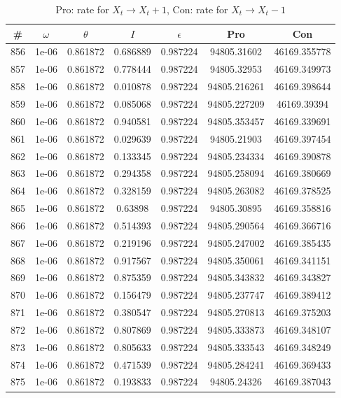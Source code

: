\newpage
\begin{table}
\caption{Pro: rate for $X_t \rightarrow X_t + 1$, Con: rate for $X_t \rightarrow X_t - 1$}
\begin{tabular*}{\linewidth}{c|c|c|c|c|c|c}
\# & $\omega$ & $\theta$ & $I$ & $\epsilon$ & Pro & Con \\
\hline
856 & 1e-06 & 0.861872 & 0.686889 & 0.987224 & 94805.31602 & 46169.355778\\
857 & 1e-06 & 0.861872 & 0.778444 & 0.987224 & 94805.32953 & 46169.349973\\
858 & 1e-06 & 0.861872 & 0.010878 & 0.987224 & 94805.216261 & 46169.398644\\
859 & 1e-06 & 0.861872 & 0.085068 & 0.987224 & 94805.227209 & 46169.39394\\
860 & 1e-06 & 0.861872 & 0.940581 & 0.987224 & 94805.353457 & 46169.339691\\
861 & 1e-06 & 0.861872 & 0.029639 & 0.987224 & 94805.21903 & 46169.397454\\
862 & 1e-06 & 0.861872 & 0.133345 & 0.987224 & 94805.234334 & 46169.390878\\
863 & 1e-06 & 0.861872 & 0.294358 & 0.987224 & 94805.258094 & 46169.380669\\
864 & 1e-06 & 0.861872 & 0.328159 & 0.987224 & 94805.263082 & 46169.378525\\
865 & 1e-06 & 0.861872 & 0.63898 & 0.987224 & 94805.30895 & 46169.358816\\
866 & 1e-06 & 0.861872 & 0.514393 & 0.987224 & 94805.290564 & 46169.366716\\
867 & 1e-06 & 0.861872 & 0.219196 & 0.987224 & 94805.247002 & 46169.385435\\
868 & 1e-06 & 0.861872 & 0.917567 & 0.987224 & 94805.350061 & 46169.341151\\
869 & 1e-06 & 0.861872 & 0.875359 & 0.987224 & 94805.343832 & 46169.343827\\
870 & 1e-06 & 0.861872 & 0.156479 & 0.987224 & 94805.237747 & 46169.389412\\
871 & 1e-06 & 0.861872 & 0.380547 & 0.987224 & 94805.270813 & 46169.375203\\
872 & 1e-06 & 0.861872 & 0.807869 & 0.987224 & 94805.333873 & 46169.348107\\
873 & 1e-06 & 0.861872 & 0.805633 & 0.987224 & 94805.333543 & 46169.348249\\
874 & 1e-06 & 0.861872 & 0.471539 & 0.987224 & 94805.284241 & 46169.369433\\
875 & 1e-06 & 0.861872 & 0.193833 & 0.987224 & 94805.24326 & 46169.387043\\

\end{tabular*}
\end{table}
